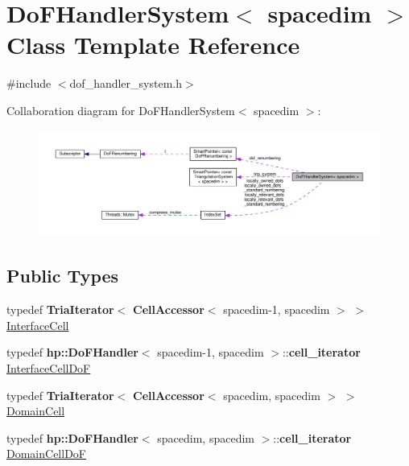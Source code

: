 \hypertarget{class_do_f_handler_system}{}\section{Do\+F\+Handler\+System$<$ spacedim $>$ Class Template Reference}
\label{class_do_f_handler_system}


{\ttfamily \#include $<$dof\+\_\+handler\+\_\+system.\+h$>$}



Collaboration diagram for Do\+F\+Handler\+System$<$ spacedim $>$\+:\nopagebreak
\begin{figure}[H]
\begin{center}
\leavevmode
\includegraphics[width=350pt]{class_do_f_handler_system__coll__graph}
\end{center}
\end{figure}
\subsection*{Public Types}
\begin{DoxyCompactItemize}
\item 
typedef {\bf Tria\+Iterator}$<$ {\bf Cell\+Accessor}$<$ spacedim-\/1, spacedim $>$ $>$ \hyperlink{class_do_f_handler_system_a64bfb9dab5f61c2583896a7d086cb1f2}{Interface\+Cell}
\item 
typedef {\bf hp\+::\+Do\+F\+Handler}$<$ spacedim-\/1, spacedim $>$\+::{\bf cell\+\_\+iterator} \hyperlink{class_do_f_handler_system_a82e65f8c260f076489bd92615221a1d0}{Interface\+Cell\+DoF}
\item 
typedef {\bf Tria\+Iterator}$<$ {\bf Cell\+Accessor}$<$ spacedim, spacedim $>$ $>$ \hyperlink{class_do_f_handler_system_a84df955a5d8da7e1439a10f2a64811c0}{Domain\+Cell}
\item 
typedef {\bf hp\+::\+Do\+F\+Handler}$<$ spacedim, spacedim $>$\+::{\bf cell\+\_\+iterator} \hyperlink{class_do_f_handler_system_a01c54960bba8faa935d32f2d3d2fe914}{Domain\+Cell\+DoF}
\end{DoxyCompactItemize}
